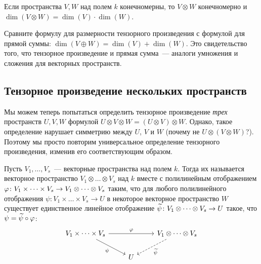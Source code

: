 \begin{corollary}
Если пространства $V,W$ над полем $k$ конечномерны, то $V\otimes W$
конечномерно и $\dim(V\otimes W) = \dim(V)\cdot\dim(W)$.
\end{corollary}

\begin{remark}
Сравните формулу для размерности тензорного произведения с формулой
для прямой суммы: $\dim(V\oplus W) = \dim(V) + \dim(W)$. Это
свидетельство того, что тензорное произведение и прямая сумма~---
аналоги умножения и сложения для векторных пространств.
\end{remark}

\subsection{Тензорное произведение нескольких пространств}


Мы можем теперь попытаться определить тензорное произведение
{\it трех} пространств $U,V,W$ формулой $U\otimes V\otimes W =
(U\otimes V)\otimes W$. Однако, такое определение нарушает симметрию
между $U$, $V$ и $W$ (почему не $U\otimes (V\otimes W)$?). Поэтому мы
просто повторим универсальное определение тензорного произведения,
изменив его соответствующим образом.

Пусть $V_1,\dots,V_s$~--- векторные пространства над полем $k$. Тогда
их 
называется векторное пространство $V_1\otimes\dots\otimes V_s$ над $k$
вместе с полилинейным отображением
$\varphi\colon V_1\times\dots\times V_s\to V_1\otimes\dots\otimes V_s$
таким, что для любого полилинейного отображения
$\psi\colon V_1\times\dots\times V_s\to U$ в некоторое векторное
пространство $W$ существует единственное линейное отображение
$\widetilde\psi\colon V_1\otimes\dots\otimes V_s\to U$ такое,
что $\psi = \widetilde\psi\circ\varphi$:
$$
\begin{tikzcd}
V_1\times\dots\times V_s \arrow{rr}{\ph} \arrow{rd}[swap]{\psi}
& & V_1 \otimes\dots\otimes V_s \arrow[dashed]{ld}{\tld\psi} \\
& U
\end{tikzcd}
$$

